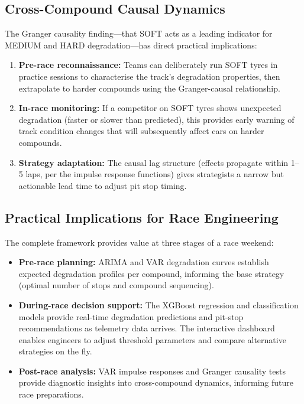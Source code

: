 \documentclass[journal,twoside]{IEEEtran}
\begin{document}
\subsection{Cross-Compound Causal Dynamics}

The Granger causality finding---that SOFT acts as a leading indicator
for MEDIUM and HARD degradation---has direct practical implications:

\begin{enumerate}
  \item \textbf{Pre-race reconnaissance:}  Teams can deliberately run
  SOFT tyres in practice sessions to characterise the track's
  degradation properties, then extrapolate to harder compounds using the
  Granger-causal relationship.

  \item \textbf{In-race monitoring:}  If a competitor on SOFT tyres
  shows unexpected degradation (faster or slower than predicted), this
  provides early warning of track condition changes that will
  subsequently affect cars on harder compounds.

  \item \textbf{Strategy adaptation:}  The causal lag structure
  (effects propagate within 1--5 laps, per the impulse response
  functions) gives strategists a narrow but actionable lead time to
  adjust pit stop timing.
\end{enumerate}

\subsection{Practical Implications for Race Engineering}

The complete framework provides value at three stages of a race weekend:

\begin{itemize}
  \item \textbf{Pre-race planning:}  ARIMA and VAR degradation curves
  establish expected degradation profiles per compound, informing the
  base strategy (optimal number of stops and compound sequencing).

  \item \textbf{During-race decision support:}  The XGBoost regression
  and classification models provide real-time degradation predictions
  and pit-stop recommendations as telemetry data arrives.  The
  interactive dashboard enables engineers to adjust threshold parameters
  and compare alternative strategies on the fly.

  \item \textbf{Post-race analysis:}  VAR impulse responses and
  Granger causality tests provide diagnostic insights into
  cross-compound dynamics, informing future race preparations.
\end{itemize}
\end{document}
